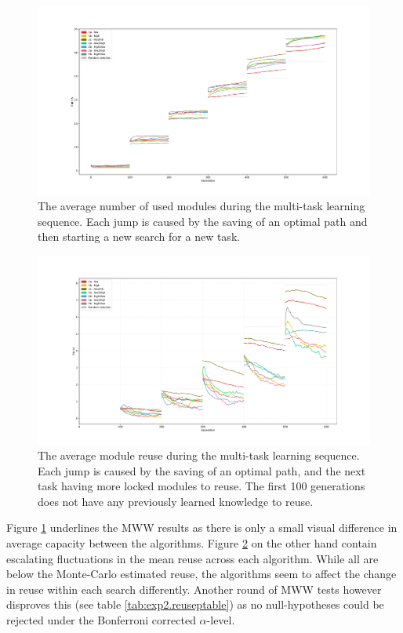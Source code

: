 \begin{figure}
    \includegraphics[width=1.2\textwidth,center]{Chapters/4.Experiments/exp2/figures/large/Capacity_pr_generation.pdf}
    \caption{The average number of used modules during the multi-task learning sequence. Each jump is caused by the saving of an optimal path and then starting a new search for a new task. }
    \label{fig:search.capacity}
\end{figure}

\begin{figure}
    \includegraphics[width=1.2\textwidth,center]{Chapters/4.Experiments/exp2/figures/large/Module_reuse_pr_generation.pdf}
    \caption{The average module reuse during the multi-task learning sequence. Each jump is caused by the saving of an optimal path, and the next task having more locked modules to reuse. The first 100 generations does not have any previously learned knowledge to reuse.}
    \label{fig:search.reuse}
\end{figure}

Figure \ref{fig:search.capacity} underlines the MWW results as there is only a small visual difference in average capacity between the algorithms.  Figure \ref{fig:search.reuse} on the other hand contain escalating fluctuations in the mean reuse across each algorithm. While all are below the Monte-Carlo estimated reuse, the algorithms seem to affect the change in reuse within each search differently. Another round of MWW tests however disproves this (see table \ref{tab:exp2.reuseptable}) as no null-hypotheses could be rejected under the Bonferroni corrected \(\alpha\)-level.

